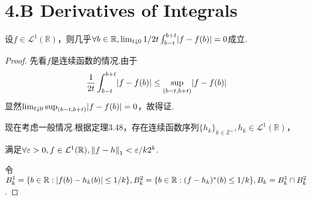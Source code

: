 \section{4.B Derivatives of Integrals}

\begin{theorem}[4.10]\label{4.10}
    设\(f \in \mathcal{L}^1(\mathbb{R})\)，则几乎\(\forall b \in \mathbb{R}, \lim_{t \downarrow 0} 1/2t \int_{b-t}^{b+t} \abs*{f-f(b)}=0\)成立.
\end{theorem}

\begin{proof}
    先看\(f\)是{\kaishu 连续函数}的情况.由于
    \begin{align*}
        \frac{1}{2t} \int_{b-t}^{b+t} \abs*{f-f(b)} \leq \sup_{(b-t,b+t)} \abs*{f-f(b)}
    \end{align*}
    显然\(\lim_{t \downarrow 0} \sup_{(b-t,b+t)} \abs*{f-f(b)}=0\)，故得证.

    现在考虑{\kaishu 一般情况}.根据定理3.48，存在连续函数序列\(\{h_k\}_{k \in \mathbb{Z}^+}, h_k \in \mathcal{L}^1(\mathbb{R})\)，
    
    满足\(\forall \varepsilon>0, f \in \mathcal{L}^1(\mathbb{R}), \norm*{f-h}_1<\varepsilon/k 2^k\).

    令\(B_k^1=\{b \in \mathbb{R}: \abs*{f(b)-h_k(b)} \leq 1/k\}, B_k^2=\{b \in \mathbb{R}: (f-h_k)^*(b) \leq 1/k\}, B_k=B_k^1 \cap B_k^2\).
    

\end{proof}
